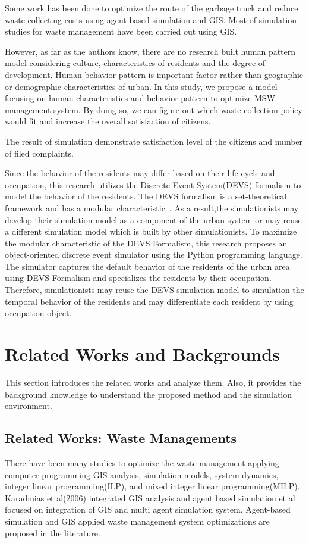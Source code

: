 \documentclass{scsSimAUDPaperFormat}
\begin{document}
Some work has been done to optimize the route of the garbage truck and reduce waste collecting costs using agent based simulation and GIS\cite{dyson2005forecasting}\cite{}. Most of simulation studies for waste management have been carried out using GIS.



However, as far as the authors know, there are no research built human pattern model considering culture, characteristics of residents and the degree of development. Human behavior pattern is important factor rather than geographic or demographic characteristics of urban.
In this study, we propose a model focusing on human characteristics and behavior pattern to optimize MSW management system. By doing so, we can figure out which waste collection policy would fit and increase the overall satisfaction of citizens. 

The result of simulation demonstrate satisfaction level of the citizens and number of filed complaints.

Since the behavior of the residents may differ based on their life cycle and occupation, this research utilizes the Discrete Event System(DEVS) formalism to model the behavior of the residents. The DEVS formalism
is a set-theoretical framework and has a modular characteristic~\cite{Zeigler84, Zeigler90, tms2000}. As a result,the simulationists may develop their simulation model as a component of the urban system or may reuse a different simulation model which is built by other simulationists. 
To maximize the modular characteristic of the DEVS Formalism, this research proposes an object-oriented discrete event simulator using the Python programming language. The simulator captures the default behavior of the residents of the urban area using DEVS Formalism and specializes the residents by their occupation. Therefore, simulationists may reuse the DEVS simulation model to simulation the temporal behavior of the residents and may differentiate each resident by using occupation object. 

\section{Related Works and Backgrounds}
This section introduces the related works and analyze them. Also, it provides the background knowledge to understand the proposed method and the simulation environment.

\subsection{Related Works: Waste Managements}
There have been many studies to optimize the waste management applying computer programming GIS analysis, simulation models, system dynamics, integer linear programming(ILP), and mixed integer linear programming(MILP).
Karadmias et al(2006)\cite{karadimas2006coupling} integrated GIS analysis and agent based simulation
et al 
\cite{karadimas2006coupling} focused on integration of GIS and multi agent simulation system. 
Agent-based simulation and GIS applied waste management system optimizations are proposed in the literature. \cite{karadimas2006coupling,shi2013multi,nguyenemission,nambiar2013multi,hua2016towards}
\end{document}
